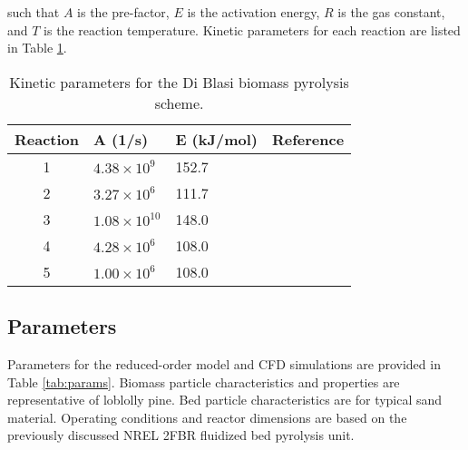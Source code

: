 \noindent such that $A$ is the pre-factor, $E$ is the activation energy, $R$ is the gas constant, and $T$ is the reaction temperature. Kinetic parameters for each reaction are listed in Table \ref{tab:kinetic-params}.

\begin{table}[H]
    \centering
    \caption{Kinetic parameters for the Di Blasi biomass pyrolysis scheme.}
    \begin{tabular}{cllc}
        \hline
        Reaction    & A (1/s)               & E (kJ/mol)    & Reference     \\
        \hline
        1           & $4.38 \times 10^9$    & 152.7         & \cite{Blasi-2001} \\
        2           & $3.27 \times 10^6$    & 111.7         & \cite{Blasi-2001} \\
        3           & $1.08 \times 10^{10}$ & 148.0         & \cite{Blasi-2001} \\
        4           & $4.28 \times 10^6$    & 108.0         & \cite{Blasi-1993} \\
        5           & $1.00 \times 10^6$    & 108.0         & \cite{Blasi-1993} \\
        \hline
    \end{tabular}
    \label{tab:kinetic-params}
\end{table}

\subsection{Parameters}

Parameters for the reduced-order model and CFD simulations are provided in Table \ref{tab:params}. Biomass particle characteristics and properties are representative of loblolly pine. Bed particle characteristics are for typical sand material. Operating conditions and reactor dimensions are based on the previously discussed NREL 2FBR fluidized bed pyrolysis unit.

